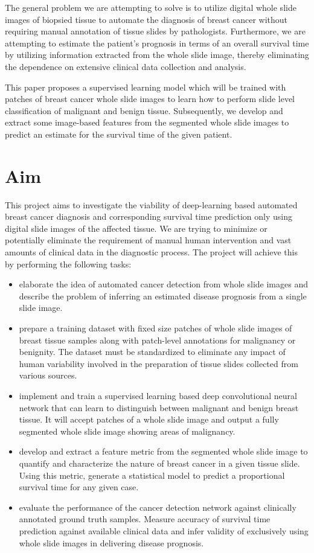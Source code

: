 \documentclass{l4proj}
\begin{document}
The general problem we are attempting to solve is to utilize digital whole slide images of biopsied tissue to automate the diagnosis of breast cancer without requiring manual annotation of tissue slides by pathologists. Furthermore, we are attempting to estimate the patient's prognosis in terms of an overall survival time by utilizing information extracted from the whole slide image, thereby eliminating the dependence on extensive clinical data collection and analysis. 

This paper proposes a supervised learning model which will be trained with patches of breast cancer whole slide images to learn how to perform slide level classification of malignant and benign tissue. Subsequently, we develop and extract some image-based features from the segmented whole slide images to predict an estimate for the survival time of the given patient. 



\section{Aim}
This project aims to investigate the viability of deep-learning based automated breast cancer diagnosis and corresponding survival time  prediction only using digital slide images of the affected tissue. We are trying to minimize or potentially eliminate the requirement of manual human intervention and vast amounts of clinical data in the diagnostic process. The project will achieve this by performing the following tasks:

\begin{itemize}
    \item
    elaborate the idea of automated cancer detection from whole slide images and describe the problem of inferring an estimated disease prognosis from a single slide image. 
    \item 
    prepare a training dataset with fixed size patches of whole slide images of breast tissue samples along with patch-level annotations for malignancy or benignity. The dataset must be standardized to eliminate any impact of human variability involved in the preparation of tissue slides collected from various sources.
    \item
    implement and train a supervised learning based deep convolutional neural network that can learn to distinguish between malignant and benign breast tissue. It will accept patches of a whole slide image and output a fully segmented whole slide image showing areas of malignancy.
    \item
    develop and extract a feature metric from the segmented whole slide image to quantify and characterize the nature of breast cancer in a given tissue slide. Using this metric, generate a statistical model to predict a proportional survival time for any given case. 
    \item
    evaluate the performance of the cancer detection network against clinically annotated ground truth samples. Measure accuracy of survival time prediction against available clinical data and infer validity of exclusively using whole slide images in delivering disease prognosis. 
\end{itemize}
\end{document}
